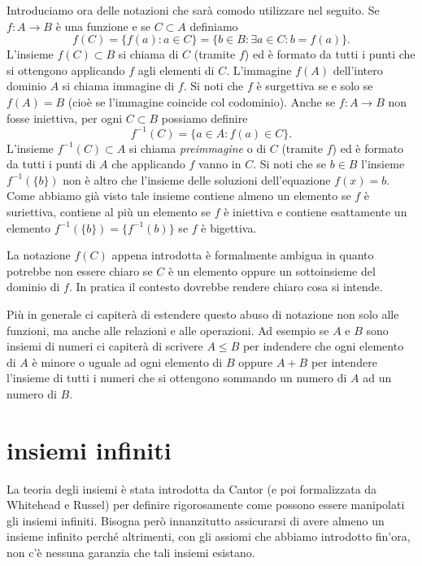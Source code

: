 Introduciamo ora delle notazioni che sarà comodo utilizzare nel seguito.
Se $f\colon A \to B$ è una funzione e se $C\subset A$ definiamo
\[
  f(C) = \{f(a)\colon a \in C\} = \{b\in B\colon \exists a\in C\colon b=f(a)\}.
\]
L'insieme $f(C)\subset B$ si chiama 
%
di $C$ (tramite $f$) ed è formato
da tutti i punti che si ottengono applicando $f$ agli elementi di $C$.
L'immagine $f(A)$ dell'intero dominio $A$ si chiama immagine di $f$.
Si noti che $f$ è surgettiva se e solo se $f(A)=B$ (cioè se l'immagine coincide
col codominio).
Anche se $f\colon A \to B$ non fosse iniettiva,
per ogni $C\subset B$ possiamo definire
\[
  f^{-1}(C) = \{a\in A\colon f(a) \in C\}.
\]
L'insieme $f^{-1}(C)\subset A$ si chiama \emph{preimmagine}
o 
%
di $C$ (tramite $f$)
ed è formato da tutti i punti di $A$ che applicando $f$ vanno in $C$.
Si noti che se $b\in B$ l'insieme $f^{-1}(\{b\})$ non è altro che
l'insieme delle soluzioni dell'equazione $f(x)=b$. Come abbiamo
già visto tale insieme contiene almeno un elemento se $f$ è suriettiva,
contiene al più un elemento se $f$ è iniettiva e contiene esattamente
un elemento $f^{-1}(\{b\}) = \{f^{-1}(b)\}$ se $f$ è bigettiva.

La notazione $f(C)$ appena introdotta è formalmente ambigua in quanto
potrebbe non essere chiaro se $C$ è un elemento oppure un sottoinsieme
del dominio di $f$.
In pratica il contesto dovrebbe rendere chiaro cosa si intende.

Più in generale ci capiterà di estendere questo abuso di notazione non solo
alle funzioni, ma anche alle relazioni e alle operazioni.
Ad esempio se $A$ e $B$ sono insiemi di numeri ci capiterà di scrivere $A\le B$
per indendere che ogni elemento di $A$ è minore o uguale ad ogni elemento di $B$
oppure $A+B$ per intendere l'insieme di tutti i numeri che si ottengono sommando
un numero di $A$ ad un numero di $B$.

\section{insiemi infiniti}

La teoria degli insiemi è stata introdotta da Cantor (e poi formalizzata
da Whitehead e Russel) per definire rigorosamente come possono essere
manipolati gli insiemi infiniti. Bisogna però innanzitutto assicurarsi
di avere almeno un insieme infinito perché altrimenti, con gli assiomi
che abbiamo introdotto fin'ora, non c'è nessuna garanzia che tali insiemi esistano.


